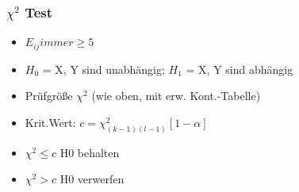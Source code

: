 \documentclass[a4paper]{article}
\begin{document}
\begin{landscape}
\begin{multicols}{4}
        \subsubsection*{$\chi^2$ Test}
        \begin{itemize}[noitemsep,nolistsep,leftmargin=*]
            \item $E_{ij} immer  \geq 5$
            \item $H_0$ = X, Y sind unabhängig; $H_1$ = X, Y sind abhängig 
            \item Prüfgröße $\chi^2$ (wie oben, mit erw. Kont.-Tabelle)
            \item Krit.Wert: $c = \chi^2_{(k-1)(l-1)}[1-\alpha]$
            \item $\chi^2  \leq c$ H0 behalten
            \item $\chi^2 > c$ H0 verwerfen
        \end{itemize}


\end{multicols}
\end{landscape}
\end{document}
